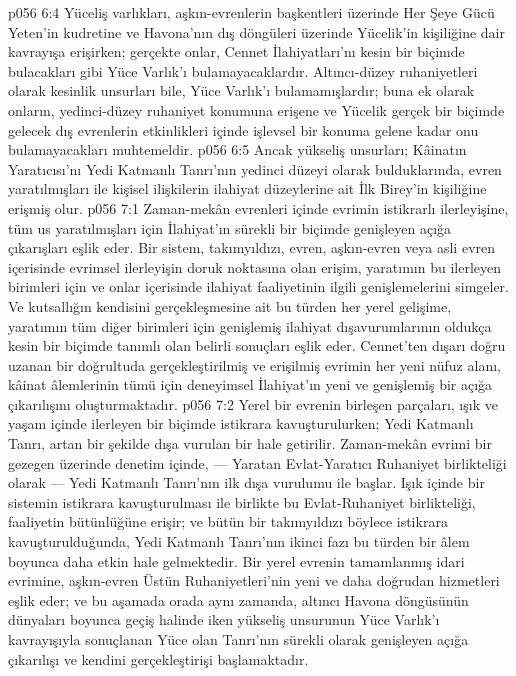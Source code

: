 \vs p056 6:4 Yüceliş varlıkları, aşkın\hyp{}evrenlerin başkentleri üzerinde Her Şeye Gücü Yeten’in kudretine ve Havona’nın dış döngüleri üzerinde Yücelik’in kişiliğine dair kavrayışa erişirken; gerçekte onlar, Cennet İlahiyatları’nı kesin bir biçimde bulacakları gibi Yüce Varlık’ı bulamayacaklardır. Altıncı\hyp{}düzey ruhaniyetleri olarak kesinlik unsurları bile, Yüce Varlık’ı bulamamışlardır; buna ek olarak onların, yedinci\hyp{}düzey ruhaniyet konumuna erişene ve Yücelik gerçek bir biçimde gelecek dış evrenlerin etkinlikleri içinde işlevsel bir konuma gelene kadar onu bulamayacakları muhtemeldir.
\vs p056 6:5 Ancak yükseliş unsurları; Kâinatın Yaratıcısı’nı Yedi Katmanlı Tanrı’nın yedinci düzeyi olarak bulduklarında, evren yaratılmışları ile kişisel ilişkilerin  ilahiyat düzeylerine ait İlk Birey’in kişiliğine erişmiş olur.
\vs p056 7:1 Zaman\hyp{}mekân evrenleri içinde evrimin istikrarlı ilerleyişine, tüm us yaratılmışları için İlahiyat’ın sürekli bir biçimde genişleyen açığa çıkarışları eşlik eder. Bir sistem, takımyıldızı, evren, aşkın\hyp{}evren veya asli evren içerisinde evrimsel ilerleyişin doruk noktasına olan erişim, yaratımın bu ilerleyen birimleri için ve onlar içerisinde ilahiyat faaliyetinin ilgili genişlemelerini simgeler. Ve kutsallığın kendisini gerçekleşmesine ait bu türden her yerel gelişime, yaratımın tüm diğer birimleri için genişlemiş ilahiyat dışavurumlarının oldukça kesin bir biçimde tanımlı olan belirli sonuçları eşlik eder. Cennet’ten dışarı doğru uzanan bir doğrultuda gerçekleştirilmiş ve erişilmiş evrimin her yeni nüfuz alanı, kâinat âlemlerinin tümü için deneyimsel İlahiyat’ın yeni ve genişlemiş bir açığa çıkarılışını oluşturmaktadır.
\vs p056 7:2 Yerel bir evrenin birleşen parçaları, ışık ve yaşam içinde ilerleyen bir biçimde istikrara kavuşturulurken; Yedi Katmanlı Tanrı, artan bir şekilde dışa vurulan bir hale getirilir. Zaman\hyp{}mekân evrimi bir gezegen üzerinde denetim içinde, --- Yaratan Evlat\hyp{}Yaratıcı Ruhaniyet birlikteliği olarak --- Yedi Katmanlı Tanrı’nın ilk dışa vurulumu ile başlar. Işık içinde bir sistemin istikrara kavuşturulması ile birlikte bu Evlat\hyp{}Ruhaniyet birlikteliği, faaliyetin bütünlüğüne erişir; ve bütün bir takımyıldızı böylece istikrara kavuşturulduğunda, Yedi Katmanlı Tanrı’nın ikinci fazı bu türden bir âlem boyunca daha etkin hale gelmektedir. Bir yerel evrenin tamamlanmış idari evrimine, aşkın\hyp{}evren Üstün Ruhaniyetleri’nin yeni ve daha doğrudan hizmetleri eşlik eder; ve bu aşamada orada aynı zamanda, altıncı Havona döngüsünün dünyaları boyunca geçiş halinde iken yükseliş unsurunun Yüce Varlık’ı kavrayışıyla sonuçlanan Yüce olan Tanrı’nın sürekli olarak genişleyen açığa çıkarılışı ve kendini gerçekleştirişi başlamaktadır.
